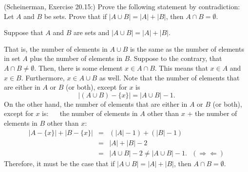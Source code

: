 \documentclass{article}
\theoremstyle{definition}
\begin{document}
\begin{question}
    (Scheinerman, Exercise 20.15:)
    Prove the following statement by contradiction:\\ Let $A$ and $B$ be sets.  Prove that if $|A \cup B| = |A| + |B|$, then $A\cap B = \emptyset$.
\end{question}
\begin{solution}
Suppose that $A$ and $B$ are sets and $|A \cup B | = |A| + |B|$.

That is, the number of elements in $A \cup B$ is the same as the number of elements in set $A$ plus the number of elements in $B$. 
Suppose to the contrary, that $A \cap B \neq \emptyset$. 
Then, there is some element $x \in A \cap B$.  This means that $x \in A$ and $x \in B$.  Furthermore, $x \in A \cup B$ as well. 
Note that the number of elements that are either in $A$ or $B$ (or both), except for $x$ is
\[ |(A \cup B) - \{x\}| = |A \cup B| - 1. \]
On the other hand, the number of elements that are either in $A$ or $B$ (or both), except for $x$ is: ~~ the number of elements in $A$ other than $x$ + the number of elements in $B$ other than $x$:
\begin{eqnarray*}
|A - \{x\}| + |B - \{x\}| & = & (|A| - 1) + (|B| - 1) \\
	& = & |A| + |B| - 2 \\
	& = & |A \cup B| - 2 \neq |A \cup B| - 1.  ~~~ (\Rightarrow\Leftarrow)
\end{eqnarray*}
Therefore, it must be the case that if $|A \cup B | = |A| + |B|$, then $A \cap B = \emptyset$.
\end{solution}
\end{document}
